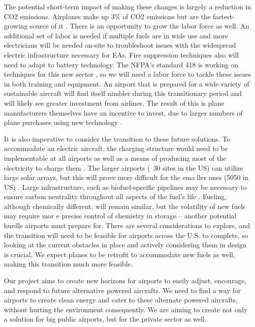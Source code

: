 \documentclass[../main.tex]{subfiles}
\begin{document}
The potential short-term impact of making these changes is largely a reduction in CO2 emissions. Airplanes make up 3\% of CO2 emissions but are the fastest-growing source of it \cite{ref6}.  There is an opportunity to grow the labor force as well. An additional set of labor is needed if multiple fuels are in wide use and more electricians will be needed on-site to troubleshoot issues with the widespread electric infrastructure necessary for EAs. Fire suppression techniques also will need to adapt to battery technology. The NFPA's standard 418 is working on techniques for this new sector \cite{ref17}, so we will need a labor force to tackle these issues in both training and equipment. An airport that is prepared for a wide variety of sustainable aircraft will find itself nimbler during this transitionary period and will likely see greater investment from airlines. The result of this is plane manufacturers themselves have an incentive to invest, due to larger numbers of plane purchases using new technology \cite{ref6}.\par 
It is also imperative to consider the transition to these future solutions. To accommodate an electric aircraft, the charging structure would need to be implementable at all airports as well as a means of producing most of the electricity to charge them \cite{ref4}. The larger airports (~30 sites in the US) can utilize large solar arrays, but this will prove more difficult for the sma ller ones (5050 in US) \cite{ref4}. Large infrastructure, such as biofuel-specific pipelines may be necessary to ensure carbon neutrality throughout all aspects of the fuel's life \cite{ref5}. Fueling, although chemically different, will remain similar, but the volatility of new fuels may require mor e precise control of chemistry in storage -- another potential hurdle airports must prepare for. There are several considerations to explore, and the transition will need to be feasible for airports across the U.S. to complete, so looking at the current obstacles in place and actively considering them in design is crucial. We expect planes to be retrofit to accommodate new fuels as well, making this transition much more feasible.\par
Our project aims to create new horizons for airports to easily adjust, encourage, and respond to future alternative powered aircrafts. We need to find a way for airports to create clean energy and cater to these alternate powered aircrafts, without hurting the environment consequently. We are aiming to create not only a solution for big public airports, but for the private sector as well.
\end{document}
